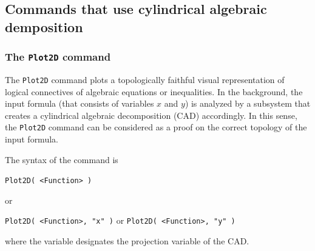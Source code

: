 \documentclass{article}
\begin{document}
\subsection{Commands that use cylindrical algebraic demposition}

\subsubsection{The \texttt{Plot2D} command}

The \texttt{Plot2D} command plots a topologically faithful visual representation of logical connectives of algebraic equations or inequalities. In the background, the input formula (that consists of variables $x$ and $y$) is analyzed by a subsystem that creates a cylindrical algebraic decomposition (CAD) accordingly. In this sense, the \texttt{Plot2D} command can be considered as a proof on the correct topology of the input formula.

The syntax of the command is
\begin{center}
    \texttt{Plot2D( <Function> )}
\end{center}
or
\begin{center}
    \texttt{Plot2D( <Function>, "x" )} or \texttt{Plot2D( <Function>, "y" )}
\end{center}
where the variable designates the projection variable of the CAD.
\end{document}
